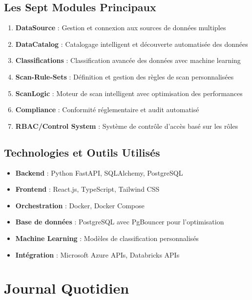 \documentclass[12pt,a4paper]{article}
\begin{document}
\subsection{Les Sept Modules Principaux}
\begin{enumerate}[leftmargin=1.2em]
  \item \textbf{DataSource} : Gestion et connexion aux sources de données multiples
  \item \textbf{DataCatalog} : Catalogage intelligent et découverte automatisée des données
  \item \textbf{Classifications} : Classification avancée des données avec machine learning
  \item \textbf{Scan-Rule-Sets} : Définition et gestion des règles de scan personnalisées
  \item \textbf{ScanLogic} : Moteur de scan intelligent avec optimisation des performances
  \item \textbf{Compliance} : Conformité réglementaire et audit automatisé
  \item \textbf{RBAC/Control System} : Système de contrôle d'accès basé sur les rôles
\end{enumerate}

\subsection{Technologies et Outils Utilisés}
\begin{itemize}[leftmargin=1.2em]
  \item \textbf{Backend} : Python FastAPI, SQLAlchemy, PostgreSQL
  \item \textbf{Frontend} : React.js, TypeScript, Tailwind CSS
  \item \textbf{Orchestration} : Docker, Docker Compose
  \item \textbf{Base de données} : PostgreSQL avec PgBouncer pour l'optimisation
  \item \textbf{Machine Learning} : Modèles de classification personnalisés
  \item \textbf{Intégration} : Microsoft Azure APIs, Databricks APIs
\end{itemize}


\section{Journal Quotidien}



























\end{document}
